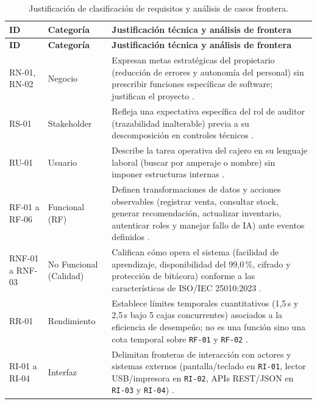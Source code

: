\documentclass[onecolumn,12pt,a4paper]{IEEEtran}
\begin{document}
	\begin{longtable}{>{\raggedright\arraybackslash}p{1.4cm} >{\raggedright\arraybackslash}p{2.4cm} >{\raggedright\arraybackslash}p{11.2cm}}
		\caption{Justificaci\'on de clasificaci\'on de requisitos y an\'alisis de casos frontera.}
		\label{tab:justif_clasif}\\
		\toprule
		\textbf{ID} & \textbf{Categor\'ia} & \textbf{Justificaci\'on t\'ecnica y an\'alisis de frontera} \\
		\midrule
		\endfirsthead
		\toprule
		\textbf{ID} & \textbf{Categor\'ia} & \textbf{Justificaci\'on t\'ecnica y an\'alisis de frontera} \\
		\midrule
		\endhead
		\bottomrule
		\endfoot
		RN-01, RN-02 & Negocio & Expresan metas estrat\'egicas del propietario (reducci\'on de errores y autonom\'ia del personal) sin prescribir funciones espec\'ificas de software; justifican el proyecto \cite{iso29148,wiegers2013}. \\
		\midrule
		RS-01 & Stakeholder & Refleja una expectativa espec\'ifica del rol de auditor (trazabilidad inalterable) previa a su descomposici\'on en controles t\'ecnicos \cite{iso29148,pmbok7}. \\
		\midrule
		RU-01 & Usuario & Describe la tarea operativa del cajero en su lenguaje laboral (buscar por amperaje o nombre) sin imponer estructuras internas \cite{iso29148,ireb2023}. \\
		\midrule
		RF-01 a RF-06 & Funcional (RF) & Definen transformaciones de datos y acciones observables (registrar venta, consultar stock, generar recomendaci\'on, actualizar inventario, autenticar roles y manejar fallo de IA) ante eventos definidos \cite{iso29148,pohl2025}. \\
		\midrule
		RNF-01 a RNF-03 & No Funcional (Calidad) & Califican c\'omo opera el sistema (facilidad de aprendizaje, disponibilidad del 99,0\,\%, cifrado y protecci\'on de bit\'acora) conforme a las caracter\'isticas de ISO/IEC 25010:2023 \cite{iso25010,glinz2007}. \\
		\midrule
		RR-01 & Rendimiento & Establece l\'imites temporales cuantitativos (1,5\,s y 2,5\,s bajo 5 cajas concurrentes) asociados a la eficiencia de desempe\~no; no es una funci\'on sino una cota temporal sobre \texttt{RF-01} y \texttt{RF-02} \cite{iso29148,iso25010}. \\
		\midrule
		RI-01 a RI-04 & Interfaz & Delimitan fronteras de interacci\'on con actores y sistemas externos (pantalla/teclado en \texttt{RI-01}, lector USB/impresora en \texttt{RI-02}, APIs REST/JSON en \texttt{RI-03} y \texttt{RI-04}) \cite{iso29148}. \\

\end{longtable}
\end{document}
